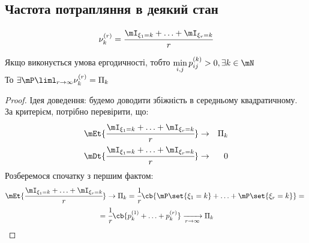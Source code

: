 \subsection{Частота потрапляння в деякий стан}
\begin{equation}
\nu_k^{(r)} = \cfrac{\mI_{\xi_1=k}+\ldots+\mI_{\xi_r=k}}{r}
\end{equation}
\begin{teor}
Якщо виконується умова ергодичності, тобто $\min\limits_{i,j}p_{ij}^{(k)} >0,\exists k\in\mN$\\
То $\exists \mP\liml_{r\to\infty} \nu_k^{(r)} = \Pi_k$\\
\end{teor}
\begin{proof}
Ідея доведення: будемо доводити збіжність в середньому квадратичному. За критерієм, потрібно перевірити, що:
\begin{eqnarray}
\mEt{\cfrac{\mI_{\xi_1=k}+\ldots+\mI_{\xi_r=k}}{r}} &\to&\Pi_k\\
\mDt{\cfrac{\mI_{\xi_1=k}+\ldots+\mI_{\xi_r=k}}{r}} &\to&0
\end{eqnarray}
Розберемося спочатку з першим фактом:
\begin{multline}
\mEt{\cfrac{\mI_{\xi_1=k}+\ldots+\mI_{\xi_r=k}}{r}} \to\Pi_k = \cfrac1r \cb{\mP\set{\xi_1=k}+\ldots+\mP\set{\xi_r=k}} ={} \\ {}= \cfrac1r \cb{p_k^{(1)} +\ldots + p_k^{(r)}} \xrightarrow[r\to\infty]{}\Pi_k
\end{multline}
\end{proof}